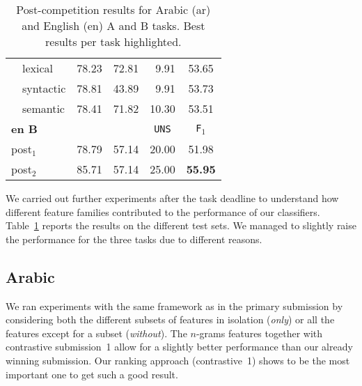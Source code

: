 \begin{table}
\begin{tabular}{|l|c@{\hskip 0.3cm}c@{\hskip 0.3cm}c@{\hskip 0.3cm}c|}
 \,\,\,\, lexical	& 78.23	& 72.81	& \,\,\,9.91	& 53.65	\\
 \,\,\,\, syntactic	& 78.81	& 43.89	& \,\,\,9.91	& 53.73	 \\
 \,\,\,\, semantic	& 78.41	& 71.82	& 10.30		& 53.51	 \\   
  \hline
  \hline
  \bf en B	& \yes & \no	& \texttt{UNS} & \texttt{F$_1$}	\\ \hline
 post$_1$	& 78.79	& 57.14	& 20.00		& 51.98 \\
 post$_2$	& 85.71	& 57.14	& 25.00 	& \bf 55.95 \\
 \hline
 \end{tabular}
 \caption{Post-competition results for Arabic (ar) and English (en) A and B 
tasks. Best results per task highlighted.
\label{tab:aftertask}}
\end{table}


We carried out further experiments after the task deadline to understand how 
different feature families contributed to the performance of our classifiers. 
Table~\ref{tab:aftertask} reports the results on the different test sets. We 
managed to slightly raise the performance for the three tasks due to different 
reasons.





\subsection{Arabic} \label{sec:discussionArabic}

We ran experiments with the same framework as in the primary submission by 
considering both the different subsets of features in isolation (\textit{only}) 
or all the features except for a subset (\textit{without}). The $n$-grams 
features together with contrastive submission~1 allow for a slightly better 
performance than our already winning submission. Our ranking approach 
(contrastive~1) shows to be the most important one to get such a good result.




